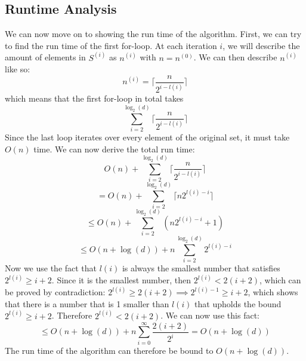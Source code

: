 \subsection{Runtime Analysis}
We can now move on to showing the run time of the algorithm. 
First, we can try to find the run time of the first for-loop. At each iteration $i$, we will describe the amount of elements in $S^{(i)}$ as $n^{(i)}$ with $n=n^{(0)}$. We can then describe $n^{(i)}$ like so:
\begin{equation}
    n^{(i)}=\lceil \frac{n}{2^{i-l(i)}} \rceil
\end{equation}
which means that the first for-loop in total takes
$$\sum_{i=2}^{\log_2(d)}\lceil \frac{n}{2^{i-l(i)}} \rceil$$
Since the last loop iterates over every element of the original set, it must take $O(n)$ time. We can now derive the total run time:
$$O(n) + \sum_{i=2}^{\log_2(d)}\lceil \frac{n}{2^{i-l(i)}} \rceil$$
$$=O(n) + \sum_{i=2}^{\log_2(d)}\lceil n2^{l(i)-i} \rceil$$
$$\leq O(n) + \sum_{i=2}^{\log_2(d)}(n2^{l(i)-i} + 1)$$
$$\leq O(n + \log(d)) + n\sum_{i=2}^{\log_2(d)}2^{l(i)-i}$$
Now we use the fact that $l(i)$ is always the smallest number that satisfies $2^{l(i)} \geq i + 2$. Since it is the smallest number, then $2^{l(i)} < 2(i+2)$, which can be proved by contradiction: $2^{l(i)} \geq 2(i+2) \implies 2^{l(i)-1} \geq i+2$, which shows that there is a number that is 1 smaller than $l(i)$ that upholds the bound $2^{l(i)} \geq i + 2$. Therefore $2^{l(i)} < 2(i+2)$. We can now use this fact:
$$\leq O(n + \log(d)) + n\sum_{i=0}^{\infty}\frac{2(i+2)}{2^{i}} = O(n+\log(d))$$
The run time of the algorithm can therefore be bound to $O(n + \log(d))$.
